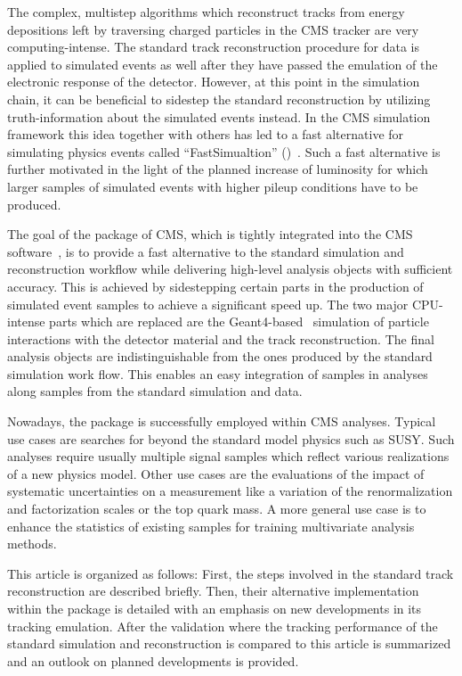 The complex, multistep algorithms which reconstruct tracks from energy depositions left by traversing charged particles in the CMS tracker are very computing-intense. The standard track reconstruction procedure for data is applied to simulated events as well after they have passed the emulation of the electronic response of the detector. However, at this point in the simulation chain, it can be beneficial to sidestep the standard reconstruction by utilizing truth-information about the simulated events instead. In the CMS simulation framework this idea together with others has led to a fast alternative for simulating physics events called ``FastSimualtion'' (\FSIM[format=hyperbf]{})~\cite{fsimRahmat,fsimAndrea}. Such a fast alternative is further motivated in the light of the planned increase of luminosity for which larger samples of simulated events with higher pileup conditions have to be produced.

The goal of the \FSIM package of CMS, which is tightly integrated into the CMS software~\cite{Bayatian:922757}, is to provide a fast alternative to the standard simulation and reconstruction workflow while delivering high-level analysis objects with sufficient accuracy. This is achieved by sidestepping certain parts in the production of simulated event samples to achieve a significant speed up. The two major CPU-intense parts which are replaced are the Geant4-based~\cite{Agostinelli2003250} simulation of particle interactions with the detector material and the track reconstruction. The final analysis objects are indistinguishable from the ones produced by the standard simulation work flow. This enables an easy integration of \FSIM samples in analyses along samples from the standard simulation and data.

Nowadays, the \FSIM package is successfully employed within CMS analyses. Typical use cases are searches for beyond the standard model physics such as SUSY. Such analyses require usually multiple signal samples which reflect various realizations of a new physics model. Other use cases are the evaluations of the impact of systematic uncertainties on a measurement like a variation of the renormalization and factorization scales or the top quark mass. A more general use case is to enhance the statistics of existing samples for training multivariate analysis methods.

This article is organized as follows: First, the steps involved in the standard track reconstruction are described briefly. Then, their alternative implementation within the \FSIM package is detailed with an emphasis on new developments in its tracking emulation. After the validation where the tracking performance of the standard simulation and reconstruction is compared to \FSIM this article is summarized and an outlook on planned developments is provided.







